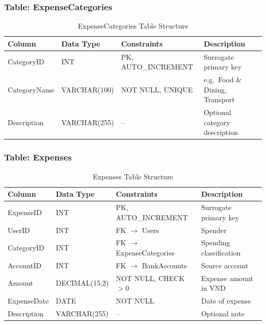 \documentclass[12pt, a4paper]{article}
\begin{document}
\subsubsection{Table: ExpenseCategories}
\begin{table}[H]
\centering
\caption{ExpenseCategories Table Structure}
\begin{tabularx}{\textwidth}{lllX}
\toprule
\textbf{Column} & \textbf{Data Type} & \textbf{Constraints} & \textbf{Description} \\
\midrule
CategoryID   & INT          & PK, AUTO\_INCREMENT & Surrogate primary key \\
CategoryName & VARCHAR(100) & NOT NULL, UNIQUE    & e.g.\ Food \& Dining, Transport \\
Description  & VARCHAR(255) & --                  & Optional category description \\
\bottomrule
\end{tabularx}
\end{table}

\subsubsection{Table: Expenses}
\begin{table}[H]
\centering
\caption{Expenses Table Structure}
\begin{tabular}{llll}
\toprule
\textbf{Column} & \textbf{Data Type} & \textbf{Constraints} & \textbf{Description} \\
\midrule
ExpenseID   & INT           & PK, AUTO\_INCREMENT        & Surrogate primary key \\
UserID      & INT           & FK $\to$ Users             & Spender \\
CategoryID  & INT           & FK $\to$ ExpenseCategories & Spending classification \\
AccountID   & INT           & FK $\to$ BankAccounts      & Source account \\
Amount      & DECIMAL(15,2) & NOT NULL, CHECK $>0$       & Expense amount in VND \\
ExpenseDate & DATE          & NOT NULL                   & Date of expense \\
Description & VARCHAR(255)  & --                         & Optional note \\
\bottomrule
\end{tabular}
\end{table}
\end{document}
